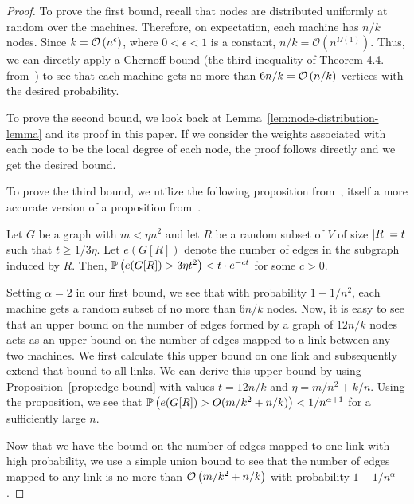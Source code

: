 \begin{proof}
    To prove the first bound, recall that nodes are distributed uniformly at random over the machines. Therefore, on expectation, each machine has \(n/k\) nodes. Since $k = \mathcal{O}\left(n^{\epsilon}\right)$, where $0 < \epsilon < 1$ is a constant, \(n/k = \mathcal{O}(n^{\Omega(1)})\). Thus, we can directly apply a Chernoff bound (the third inequality of Theorem 4.4. from~\cite{MU17}) to see that each machine gets no more than \(6n/k =  \mathcal{O}\left(n/k\right)\) vertices with the desired probability.

    To prove the second bound, we look back at Lemma~\ref{lem:node-distribution-lemma} and its proof in this paper. If we consider the weights associated with each node to be the local degree of each node, the proof follows directly and we get the desired bound.
    
    To prove the third bound, we utilize the following proposition from~\cite{PRS21}, itself a more accurate version of a proposition from~\cite{RR94}.
    
    \begin{proposition}
        \label{prop:edge-bound}
    Let \(G\) be a graph with \(m < \eta n^2\) and let \(R\) be a random subset of \(V\) of size \(\left\lvert R\right\rvert = t\) such that \(t \geq 1/3\eta\). Let \(e(G[R])\) denote the number of edges in the subgraph induced by \(R\). Then,
        $\operatorname{\mathbb{P}}\left(e(G[R]) > 3 \eta t^2\right) < t \cdot e^{-ct}$
    for some \(c > 0\).
    \end{proposition}
    
    Setting \(\alpha = 2\) in our first bound, we see that with probability \(1 - 1/n^2\), each machine gets a random subset of no more than \(6n/k\) nodes. Now, it is easy to see that an upper bound on the number of edges formed by a graph of \(12n / k\) nodes acts as an upper bound on the number of edges mapped to a link between any two machines. We first calculate this upper bound on one link and subsequently extend that bound to all links. We can derive this upper bound by using
    Proposition~\ref{prop:edge-bound} with values \(t =  12n/k\) and \(\eta = m/n^2 + k/n\). Using the proposition, we see that \(\operatorname{\mathbb{P}}\left(e(G[R]) > O(m/k^2 + n/k)\right) < 1/n^{\alpha+1}\) for a sufficiently large \(n\).
    
    Now that we have the bound on the number of edges mapped to one link with high probability, we use a simple union bound to see that the number of edges mapped to any link is no more than \(\mathcal{O}\left(m/k^2 + n/k\right)\) with probability \(1-1/n^\alpha\).
\end{proof}


